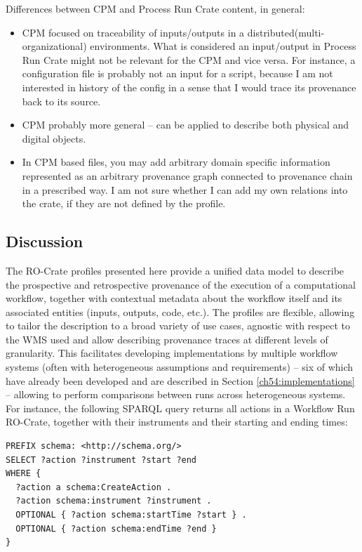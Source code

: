Differences between CPM and Process Run Crate content, in general:

\begin{itemize}
  \item 
CPM focused on traceability of inputs/outputs in a distributed(multi-organizational) environments. What is considered an input/output in Process Run Crate might not be relevant for the CPM and vice versa. For instance, a configuration file is probably not an input for a script, because I am not interested in history of the config in a sense that I would trace its provenance back to its source.
\item CPM probably more general – can be applied to describe both physical and digital objects. 
\item In CPM based files, you may add arbitrary domain specific information represented as an arbitrary provenance graph connected to provenance chain in a prescribed way. I am not sure whether I can add my own relations into the crate, if they are not defined by the profile. 
\end{itemize}


%
\subsection{Discussion}\label{ch54:discussion}


The RO-Crate profiles presented here provide a unified data model to describe the prospective and retrospective provenance of the execution of a computational workflow, together with contextual metadata about the workflow itself and its associated entities (inputs, outputs, code, etc.). 
The profiles are flexible, allowing to tailor the description to a broad variety of use cases, agnostic with respect to the WMS used and allow describing provenance traces at different levels of granularity. 
This facilitates developing implementations by multiple workflow systems (often with heterogeneous assumptions and requirements) -- six of which have already been developed and are described in Section \vref{ch54:implementations} -- allowing to perform comparisons between runs across heterogeneous systems.
For instance, the following SPARQL  query returns all actions in a Workflow Run RO-Crate, together with their instruments and their starting and ending times:

\begin{verbatim}
PREFIX schema: <http://schema.org/>
SELECT ?action ?instrument ?start ?end
WHERE {
  ?action a schema:CreateAction .
  ?action schema:instrument ?instrument .
  OPTIONAL { ?action schema:startTime ?start } .
  OPTIONAL { ?action schema:endTime ?end }
}
\end{verbatim}

